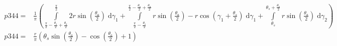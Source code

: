 \begin{align}
    p344 =&\frac{1}{\pi} \left(\int\limits_{\frac{\pi}{2} - \frac{\theta_{s}}{2} + \frac{\theta_{a}}{2}}^{\frac{\pi}{2}}2 r \sin{\left (\frac{\theta_{a}}{2} \right )}\;\mathrm{d}\gamma_{1}+\int\limits_{\frac{\pi}{2} - \frac{\theta_{s}}{2}}^{\frac{\pi}{2} - \frac{\theta_{s}}{2} + \frac{\theta_{a}}{2}}r \sin{\left (\frac{\theta_{a}}{2} \right )} - r \cos{\left (\gamma_{1} + \frac{\theta_{s}}{2} \right )}\;\mathrm{d}\gamma_{1}+\int\limits_{\theta_{s}}^{\theta_{s} + \frac{\theta_{a}}{2}}r \sin{\left (\frac{\theta_{a}}{2} \right )}\;\mathrm{d}\gamma_{2}\right)\\
    p344 =& \frac{r}{\pi} \left(\theta_{s} \sin{\left (\frac{\theta_{a}}{2} \right )} - \cos{\left (\frac{\theta_{a}}{2} \right )} + 1\right)
\end{align}
